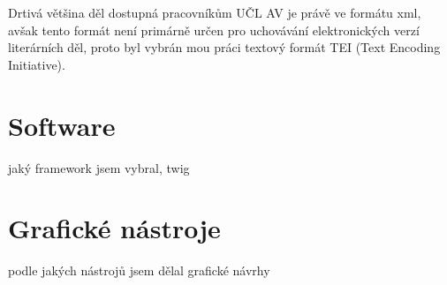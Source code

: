             Drtivá většina děl dostupná pracovníkům UČL AV je právě ve formátu xml, avšak tento formát není primárně určen pro uchovávání elektronických verzí literárních děl, proto byl vybrán mou práci textový formát TEI (Text Encoding Initiative).
    \section{Software}
        jaký framework jsem vybral, twig
    \section{Grafické nástroje}
        podle jakých nástrojů jsem dělal grafické návrhy
